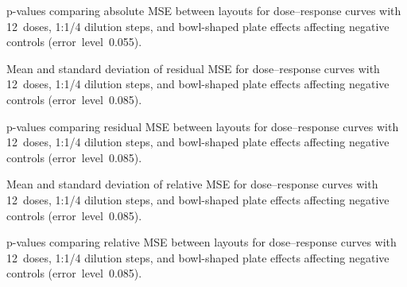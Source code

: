 \begin{table}[p]
    \centering
    \small
    
    \caption{p-values comparing absolute \ECIC{} MSE between layouts for dose--response curves with 12~doses, 1:1/4 dilution steps, and bowl-shaped plate effects affecting negative controls (error~level~0.055).}
    \label{tab:dr-absic50-pvalues-12doses-dil4-bowl-neg-controls-0.055}
\end{table}

\begin{table}[p]
    \centering
    \small
    
    \caption{Mean and standard deviation of residual MSE for dose--response curves with 12~doses, 1:1/4 dilution steps, and bowl-shaped plate effects affecting negative controls (error~level~0.085).}
    \label{tab:dr-residuals-mean-std-12doses-dil4-bowl-neg-controls-0.085}
\end{table}

\begin{table}[p]
    \centering
    \small
    
    \caption{p-values comparing residual MSE between layouts for dose--response curves with 12~doses, 1:1/4 dilution steps, and bowl-shaped plate effects affecting negative controls (error~level~0.085).}
    \label{tab:dr-residuals-pvalues-12doses-dil4-bowl-neg-controls-0.085}
\end{table}

\begin{table}[p]
    \centering
    \small
    
    \caption{Mean and standard deviation of relative \ECIC{} MSE for dose--response curves with 12~doses, 1:1/4 dilution steps, and bowl-shaped plate effects affecting negative controls (error~level~0.085).}
    \label{tab:dr-relic50-mean-std-12doses-dil4-bowl-neg-controls-0.085}
\end{table}

\begin{table}[p]
    \centering
    \small
    
    \caption{p-values comparing relative \ECIC{} MSE between layouts for dose--response curves with 12~doses, 1:1/4 dilution steps, and bowl-shaped plate effects affecting negative controls (error~level~0.085).}
    \label{tab:dr-relic50-pvalues-12doses-dil4-bowl-neg-controls-0.085}
\end{table}

